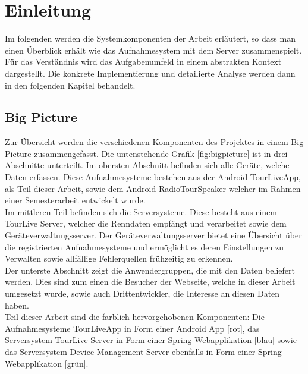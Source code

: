 \chapter{Einleitung}

Im folgenden werden die Systemkomponenten der Arbeit erläutert, so dass man einen Überblick erhält wie das Aufnahmesystem mit dem Server zusammenspielt. Für das Verständnis wird das Aufgabenumfeld in einem abstrakten Kontext dargestellt. Die konkrete Implementierung und detailierte Analyse werden dann in den folgenden Kapitel behandelt.

\section{Big Picture}
Zur Übersicht werden die verschiedenen Komponenten des Projektes in einem Big Picture zusammengefasst. Die untenstehende Grafik \ref{fig:bigpicture} ist in drei Abschnitte unterteilt. Im obersten Abschnitt befinden sich alle Geräte, welche Daten erfassen. Diese Aufnahmesysteme bestehen aus der Android TourLiveApp, als Teil dieser Arbeit, sowie dem Android RadioTourSpeaker welcher im Rahmen einer Semesterarbeit \cite{radiotourspeaker2012} entwickelt wurde.\\

Im mittleren Teil befinden sich die Serversysteme. Diese besteht aus einem TourLive Server, welcher die Renndaten empfängt und verarbeitet sowie dem Geräteverwaltungsserver. Der Geräteverwaltungsserver bietet eine Übersicht über die registrierten Aufnahmesysteme und ermöglicht es deren Einstellungen zu Verwalten sowie allfällige Fehlerquellen frühzeitig zu erkennen.\\

Der unterste Abschnitt zeigt die Anwendergruppen, die mit den Daten beliefert werden. Dies sind zum einen die Besucher der Webseite, welche in dieser Arbeit umgesetzt wurde, sowie auch Drittentwickler, die Interesse an diesen Daten haben.\\
Teil dieser Arbeit sind die farblich hervorgehobenen Komponenten: Die Aufnahmesysteme TourLiveApp in Form einer Android App [rot], das Serversystem TourLive Server in Form einer Spring Webapplikation [blau] sowie das Serversystem Device Management Server ebenfalls in Form einer Spring Webapplikation [grün].

